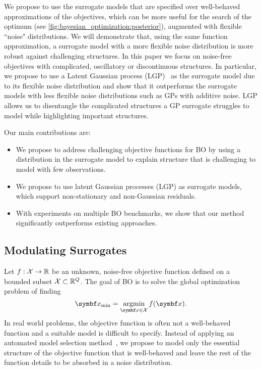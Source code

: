 We propose to use the surrogate models that are specified over well-behaved approximations of the objectives,
which can be more useful for the search of the optimum (see \cref{fig:bayesian_optimization:posterior}), augmented with flexible ``noise" distributions.
We will demonstrate that, using the same function approximation, a surrogate model with a more flexible noise distribution is more robust against challenging structures.
In this paper we focus on noise-free objectives with complicated, oscillatory or discontinuous structures.
In particular, we propose to use a Latent Gaussian process (LGP)~\parencite{pfingsten_nonstationary_2006,wang_gaussian_2012,yousefi_unsupervised_2016,bodin_latent_2017} as the surrogate model due to its flexible noise distribution and show that it outperforms the surrogate models with less flexible noise distributions such as GPs with additive noise.
LGP allows us to disentangle the complicated structures a GP surrogate struggles to model while highlighting important structures.

Our main contributions are:
\begin{itemize}
    \item We propose to address challenging objective functions for BO by using a distribution in the surrogate model to explain structure that is challenging to model with few observations.
    \item We propose to use latent Gaussian processes (LGP) as surrogate models, which support non-stationary and non-Gaussian residuals.
    \item With experiments on multiple BO benchmarks, we show that our method significantly outperforms existing approaches.
\end{itemize}

\subsection{Modulating Surrogates}
\label{toc:bayesian_optimization:modulated_objectives}

Let $f : \mathcal{X} \to \mathbb{R}$ be an unknown, noise-free objective function defined on a bounded subset $\mathcal{X} \subset \mathbb{R}^Q$.
The goal of BO is to solve the global optimization problem of finding
\begin{equation}
    \mat{x}_{\text{min}} = \argmin_{\mat{x} \in \Xc} f(\mat{x}).
\end{equation}
In real world problems,
the objective function is often not a well-behaved function and a suitable model is difficult to specify.
Instead of applying an automated model selection method~\parencite{malkomes_automating_2018},
we propose to model only the essential structure of the objective function that is well-behaved and leave the rest of the function details to be absorbed in a noise distribution.

